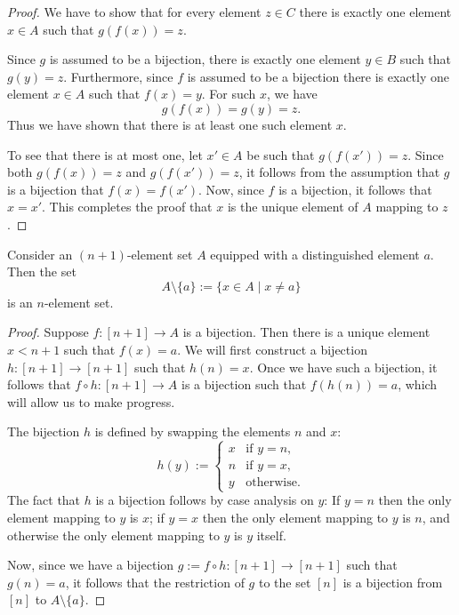 \begin{proof}
  We have to show that for every element $z\in C$ there is exactly one element $x\in A$ such that $g(f(x))=z$.

  Since $g$ is assumed to be a bijection, there is exactly one element $y\in B$ such that $g(y)=z$. Furthermore, since $f$ is assumed to be a bijection there is exactly one element $x\in A$ such that $f(x)=y$. For such $x$, we have
  \begin{equation*}
    g(f(x))=g(y)=z.
  \end{equation*}
  Thus we have shown that there is at least one such element $x$.

  To see that there is at most one, let $x'\in A$ be such that $g(f(x'))=z$. Since both $g(f(x))=z$ and $g(f(x'))=z$, it follows from the assumption that $g$ is a bijection that $f(x)=f(x')$. Now, since $f$ is a bijection, it follows that $x=x'$. This completes the proof that $x$ is the unique element of $A$ mapping to $z$.
\end{proof}

\begin{lemma}
  Consider an $(n+1)$-element set $A$ equipped with a distinguished element $a$. Then the set
  \begin{equation*}
    A\setminus\{a\}:=\{x\in A\mid x\neq a\}
  \end{equation*}
  is an $n$-element set.
\end{lemma}

\begin{proof}
  Suppose $f:[n+1]\to A$ is a bijection. Then there is a unique element $x<n+1$ such that $f(x)=a$. We will first construct a bijection $h:[n+1]\to[n+1]$ such that $h(n)=x$. Once we have such a bijection, it follows that $f\circ h:[n+1]\to A$ is a bijection such that $f(h(n))=a$, which will allow us to make progress.

  The bijection $h$ is defined by swapping the elements $n$ and $x$:
  \begin{equation*}
    h(y) :=
    \begin{cases}
      x & \text{if $y=n$},\\
      n & \text{if $y=x$},\\
      y & \text{otherwise}.
    \end{cases}
  \end{equation*}
  The fact that $h$ is a bijection follows by case analysis on $y$: If $y=n$ then the only element mapping to $y$ is $x$; if $y=x$ then the only element mapping to $y$ is $n$, and otherwise the only element mapping to $y$ is $y$ itself.

  Now, since we have a bijection $g:=f\circ h:[n+1]\to[n+1]$ such that $g(n)=a$, it follows that the restriction of $g$ to the set $[n]$ is a bijection from $[n]$ to $A\setminus\{a\}$.
\end{proof}

